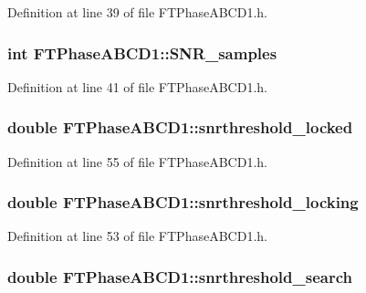 Definition at line 39 of file FTPhaseABCD1.h.

\hypertarget{classFTPhaseABCD1_ac2ec173a910e5a283e8df8caf9d995a6}{
\subsubsection[{SNR\_\-samples}]{\setlength{\rightskip}{0pt plus 5cm}int {\bf FTPhaseABCD1::SNR\_\-samples}}}
\label{classFTPhaseABCD1_ac2ec173a910e5a283e8df8caf9d995a6}


Definition at line 41 of file FTPhaseABCD1.h.

\hypertarget{classFTPhaseABCD1_ab15e502bb15bcb083a719c9e9a10135c}{
\subsubsection[{snrthreshold\_\-locked}]{\setlength{\rightskip}{0pt plus 5cm}double {\bf FTPhaseABCD1::snrthreshold\_\-locked}}}
\label{classFTPhaseABCD1_ab15e502bb15bcb083a719c9e9a10135c}


Definition at line 55 of file FTPhaseABCD1.h.

\hypertarget{classFTPhaseABCD1_ade2b7bc75653e7c0f11c2ceea1a483e9}{
\subsubsection[{snrthreshold\_\-locking}]{\setlength{\rightskip}{0pt plus 5cm}double {\bf FTPhaseABCD1::snrthreshold\_\-locking}}}
\label{classFTPhaseABCD1_ade2b7bc75653e7c0f11c2ceea1a483e9}


Definition at line 53 of file FTPhaseABCD1.h.

\hypertarget{classFTPhaseABCD1_a73d2c981e855d4fe78aa936b57a2d607}{
\subsubsection[{snrthreshold\_\-search}]{\setlength{\rightskip}{0pt plus 5cm}double {\bf FTPhaseABCD1::snrthreshold\_\-search}}}
\label{classFTPhaseABCD1_a73d2c981e855d4fe78aa936b57a2d607}


